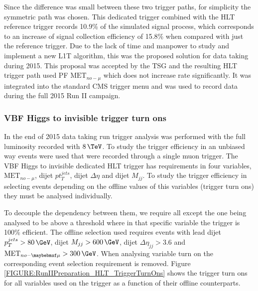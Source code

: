 Since the difference was small between these two trigger paths, for simplicity the symmetric path was chosen. This dedicated trigger combined with the \gls{HLT} reference trigger records 10.9\% of the simulated signal process, which corresponds to an increase of signal collection efficiency of 15.8\% when compared with just the reference trigger. Due to the lack of time and manpower to study and implement a new \gls{L1T} algorithm, this was the proposed solution for data taking during 2015. This proposal was accepted by the \gls{TSG} and the resulting \gls{HLT} trigger path used \gls{PF} $\text{MET}_{no-\mu}$ which does not increase rate significantly. It was integrated into the standard \gls{CMS} trigger menu and was used to record data during the full 2015 Run II campaign.

\subsubsection{VBF Higgs to invisible trigger turn ons}
\label{SECTION:RunIITriggerStudies_HLTAlgorithmDevelopment_TriggerTurnOns}

In the end of 2015 data taking run trigger analysis was performed with the full luminosity recorded with $8\,\TeV$. To study the trigger efficiency in an unbiased way events were used that were recorded through a single muon trigger. The \gls{VBF} Higgs to invisible dedicated \gls{HLT} trigger has requirements in four variables, $\text{MET}_{no-\mu}$, dijet $pt_T^{jets}$, dijet $\Delta\eta$ and dijet $M_{jj}$. To study the trigger efficiency in selecting events depending on the offline values of this variables (trigger turn ons) they must be analysed individually. 

To decouple the dependency between them, we require all except the one being analysed to be above a threshold where in that specific variable the trigger is 100\% efficient. The offline selection used requires events with lead dijet $p_{T}^{jets}>80\,\GeV$, dijet $M_{jj}>600\,\GeV$, dijet $\Delta\eta_{jj}>3.6$ and $\text{MET}_{no-\mu}>300\,\GeV$. When analysing variable turn on the corresponding event selection requirement is removed. Figure \ref{FIGURE:RunIIPreparation_HLT_TriggerTurnOns} shows the trigger turn ons for all variables used on the trigger as a function of their offline counterparts. 

